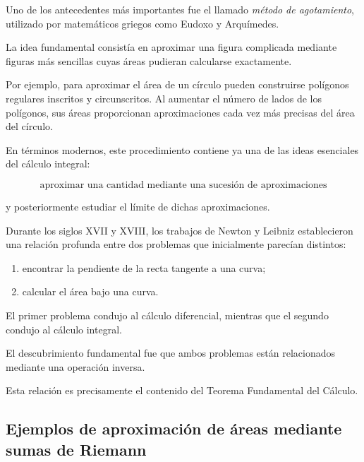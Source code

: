 \documentclass[12pt]{article}
\begin{document}
Uno de los antecedentes más importantes fue el llamado
\emph{método de agotamiento}, utilizado por matemáticos griegos como
Eudoxo y Arquímedes.

La idea fundamental consistía en aproximar una figura complicada mediante
figuras más sencillas cuyas áreas pudieran calcularse exactamente.

Por ejemplo, para aproximar el área de un círculo pueden construirse
polígonos regulares inscritos y circunscritos. Al aumentar el número de
lados de los polígonos, sus áreas proporcionan aproximaciones cada vez
más precisas del área del círculo.

En términos modernos, este procedimiento contiene ya una de las ideas
esenciales del cálculo integral:

\[
\boxed{
\text{aproximar una cantidad mediante una sucesión de aproximaciones}
}
\]

y posteriormente estudiar el límite de dichas aproximaciones.

Durante los siglos XVII y XVIII, los trabajos de Newton y Leibniz
establecieron una relación profunda entre dos problemas que inicialmente
parecían distintos:

\begin{enumerate}
    \item encontrar la pendiente de la recta tangente a una curva;
    \item calcular el área bajo una curva.
\end{enumerate}

El primer problema condujo al cálculo diferencial, mientras que el segundo
condujo al cálculo integral.

El descubrimiento fundamental fue que ambos problemas están relacionados
mediante una operación inversa.

Esta relación es precisamente el contenido del Teorema Fundamental del
Cálculo.

\subsection{Ejemplos de aproximación de áreas mediante sumas de Riemann}
\end{document}
